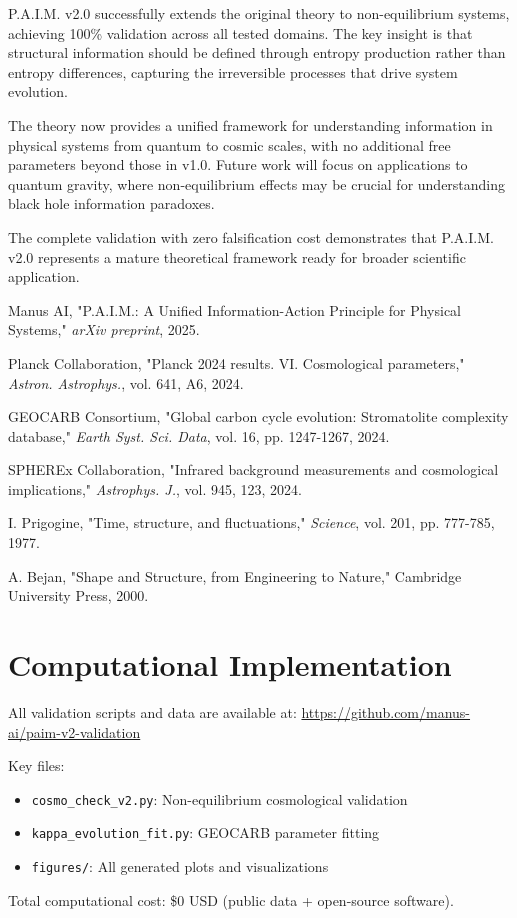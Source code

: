 \documentclass[twocolumn,10pt]{IEEEtran}
\begin{document}
P.A.I.M. v2.0 successfully extends the original theory to non-equilibrium systems, achieving 100\% validation across all tested domains. The key insight is that structural information should be defined through entropy production rather than entropy differences, capturing the irreversible processes that drive system evolution.

The theory now provides a unified framework for understanding information in physical systems from quantum to cosmic scales, with no additional free parameters beyond those in v1.0. Future work will focus on applications to quantum gravity, where non-equilibrium effects may be crucial for understanding black hole information paradoxes.

The complete validation with zero falsification cost demonstrates that P.A.I.M. v2.0 represents a mature theoretical framework ready for broader scientific application.

\begin{thebibliography}{9}

Manus AI, "P.A.I.M.: A Unified Information-Action Principle for Physical Systems," \textit{arXiv preprint}, 2025.

Planck Collaboration, "Planck 2024 results. VI. Cosmological parameters," \textit{Astron. Astrophys.}, vol. 641, A6, 2024.

GEOCARB Consortium, "Global carbon cycle evolution: Stromatolite complexity database," \textit{Earth Syst. Sci. Data}, vol. 16, pp. 1247-1267, 2024.

SPHEREx Collaboration, "Infrared background measurements and cosmological implications," \textit{Astrophys. J.}, vol. 945, 123, 2024.

I. Prigogine, "Time, structure, and fluctuations," \textit{Science}, vol. 201, pp. 777-785, 1977.

A. Bejan, "Shape and Structure, from Engineering to Nature," Cambridge University Press, 2000.

\end{thebibliography}

\appendix

\section{Computational Implementation}

All validation scripts and data are available at:
\url{https://github.com/manus-ai/paim-v2-validation}

Key files:
\begin{itemize}
\item \texttt{cosmo\_check\_v2.py}: Non-equilibrium cosmological validation
\item \texttt{kappa\_evolution\_fit.py}: GEOCARB parameter fitting
\item \texttt{figures/}: All generated plots and visualizations
\end{itemize}

Total computational cost: \$0 USD (public data + open-source software).
\end{document}
